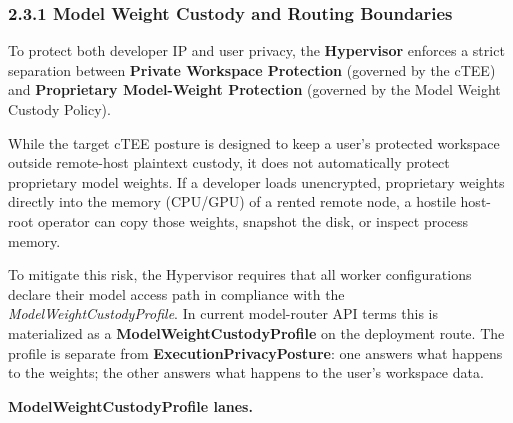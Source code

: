 \documentclass[
  11pt,
]{article}
\begin{document}
\hypertarget{model-weight-custody-and-routing-boundaries}{%
\subsubsection{2.3.1 Model Weight Custody and Routing
Boundaries}\label{model-weight-custody-and-routing-boundaries}}

To protect both developer IP and user privacy, the \textbf{Hypervisor}
enforces a strict separation between \textbf{Private Workspace
Protection} (governed by the cTEE) and \textbf{Proprietary Model-Weight
Protection} (governed by the Model Weight Custody Policy).

While the target cTEE posture is designed to keep a user's protected workspace
outside remote-host plaintext custody, it does not automatically
protect proprietary model weights. If a developer loads unencrypted,
proprietary weights directly into the memory (CPU/GPU) of a rented
remote node, a hostile host-root operator can copy those weights,
snapshot the disk, or inspect process memory.

To mitigate this risk, the Hypervisor requires that all worker
configurations declare their model access path in compliance with the
\emph{ModelWeightCustodyProfile}. In current model-router API terms this
is materialized as a \textbf{ModelWeightCustodyProfile} on the
deployment route. The profile is separate from
\textbf{ExecutionPrivacyPosture}: one answers what happens to the
weights; the other answers what happens to the user's workspace data.

\textbf{ModelWeightCustodyProfile lanes.}
\end{document}
